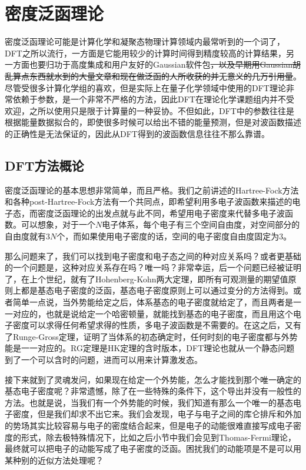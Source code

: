 \documentclass[12pt,a4paper,openany,twoside]{book}
\numberwithin{equation}{section}
\begin{document}
      \section{密度泛函理论}
        密度泛函理论可能是计算化学和凝聚态物理计算领域内最常听到的一个词了，DFT之所以流行，一方面是它能用较少的计算时间得到精度较高的计算结果，另一方面也要归功于高度集成和用户友好的Gaussian软件包\sout{，以及早期用Gaussian胡乱算点东西就水到的大量文章和现在做泛函的人所收获的并无意义的几万引用量}。尽管受很多计算化学组的喜欢，但是实际上在量子化学领域中使用的DFT理论非常依赖于参数，是一个非常不严格的方法，因此DFT在理论化学课题组内并不受欢迎，之所以使用只是限于计算量的一种妥协。不但如此，DFT中的参数往往是根据能量数据拟合的，即使很多时候可以给出不错的能量预测，但是对波函数描述的正确性是无法保证的，因此从DFT得到的波函数信息往往不那么靠谱。
        \subsection{DFT方法概论}
          密度泛函理论的基本思想非常简单，而且严格。我们之前讲述的Hartree-Fock方法和各种post-Hartree-Fock方法有一个共同点，即希望利用多电子波函数来描述的电子态，而密度泛函理论的出发点就与此不同，希望用电子密度来代替多电子波函数。可以想象，对于一个$N$电子体系，每个电子有三个空间自由度，对空间部分的自由度就有$3N$个，而如果使用电子密度的话，空间的电子密度自由度固定为$3$。

          那么问题来了，我们可以找到电子密度和电子态之间的种对应关系吗？或者更基础的一个问题是，这种对应关系存在吗？唯一吗？非常幸运，后一个问题已经被证明了，在上个世纪，就有了Hohenberg-Kohn两大定理，即所有可观测量的期望值原则上都是基态电子密度的泛函，基态电子密度原则上可以通过变分的方法得到。或者简单一点说，当外势能给定之后，体系基态的电子密度就给定了，而且两者是一一对应的，也就是说给定一个哈密顿量，就能找到基态的电子密度，而且用这个电子密度可以求得任何希望求得的性质，多电子波函数是不需要的。在这之后，又有了Runge-Gross定理，证明了当体系的初态确定时，任何时刻的电子密度都与外势能是一一对应的。RG定理是HK定理的含时版本，DFT理论也就从一个静态问题到了一个可以含时的问题，进而可以用来计算激发态。

          接下来就到了灵魂发问，如果现在给定一个外势能，怎么才能找到那个唯一确定的基态电子密度呢？非常遗憾，除了在一些特殊的条件下，这个导出并没有一般性的方法。也就是说，当我们有一个外势能的时候，我们知道有那么一个唯一的基态电子密度，但是我们却求不出它来。我们会发现，电子与电子之间的库仑排斥和外加的势场其实比较容易与电子的密度结合起来，但是电子的动能很难直接写成电子密度的形式，除去极特殊情况下，比如之后小节中我们会见到Thomas-Fermi理论，最终就可以把电子的动能写成了电子密度的泛函。困扰我们的动能项是不是可以用某种别的近似方法处理呢？
\end{document}

